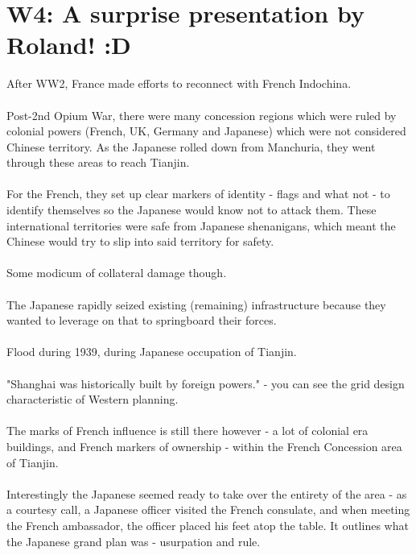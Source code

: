 \documentclass[a4paper]{article}
\begin{document}
\section{W4: A surprise presentation by Roland! :D}
After WW2, France made efforts to reconnect with French Indochina.\\
\\
Post-2nd Opium War, there were many concession regions which were ruled by colonial powers (French, UK, Germany and Japanese) which were not considered Chinese territory. As the Japanese rolled down from Manchuria, they went through these areas to reach Tianjin.\\ 
\\
For the French, they set up clear markers of identity - flags and what not - to identify themselves so the Japanese would know not to attack them. These international territories were safe from Japanese shenanigans, which meant the Chinese would try to slip into said territory for safety.\\
\\
Some modicum of collateral damage though.\\
\\
The Japanese rapidly seized existing (remaining) infrastructure because they wanted to leverage on that to springboard their forces.\\
\\
Flood during 1939, during Japanese occupation of Tianjin.\\ 
\\
"Shanghai was historically built by foreign powers." - you can see the grid design characteristic of Western planning.\\
\\
The marks of French influence is still there however - a lot of colonial era buildings, and French markers of ownership - within the French Concession area of Tianjin.\\
\\
Interestingly the Japanese seemed ready to take over the entirety of the area - as a courtesy call, a Japanese officer visited the French consulate, and when meeting the French ambassador, the officer placed his feet atop the table. It outlines what the Japanese grand plan was - usurpation and rule.
\end{document}
